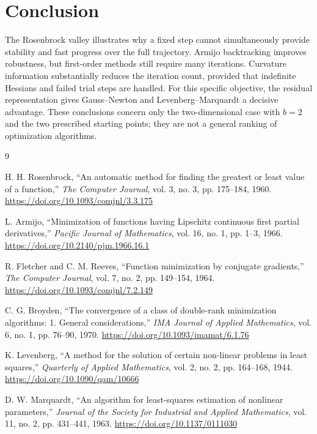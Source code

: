 \documentclass[a4paper,11pt]{article}
\begin{document}
\section{Conclusion}

The Rosenbrock valley illustrates why a fixed step cannot simultaneously
provide stability and fast progress over the full trajectory. Armijo
backtracking improves robustness, but first-order methods still require many
iterations. Curvature information substantially reduces the iteration count,
provided that indefinite Hessians and failed trial steps are handled. For this
specific objective, the residual representation gives Gauss--Newton and
Levenberg--Marquardt a decisive advantage. These conclusions concern only the
two-dimensional case with $b=2$ and the two prescribed starting points; they
are not a general ranking of optimization algorithms.

\begin{thebibliography}{9}

H. H. Rosenbrock,
``An automatic method for finding the greatest or least value of a function,''
\emph{The Computer Journal}, vol. 3, no. 3, pp. 175--184, 1960.
\url{https://doi.org/10.1093/comjnl/3.3.175}

L. Armijo,
``Minimization of functions having Lipschitz continuous first partial derivatives,''
\emph{Pacific Journal of Mathematics}, vol. 16, no. 1, pp. 1--3, 1966.
\url{https://doi.org/10.2140/pjm.1966.16.1}

R. Fletcher and C. M. Reeves,
``Function minimization by conjugate gradients,''
\emph{The Computer Journal}, vol. 7, no. 2, pp. 149--154, 1964.
\url{https://doi.org/10.1093/comjnl/7.2.149}

C. G. Broyden,
``The convergence of a class of double-rank minimization algorithms: 1. General considerations,''
\emph{IMA Journal of Applied Mathematics}, vol. 6, no. 1, pp. 76--90, 1970.
\url{https://doi.org/10.1093/imamat/6.1.76}

K. Levenberg,
``A method for the solution of certain non-linear problems in least squares,''
\emph{Quarterly of Applied Mathematics}, vol. 2, no. 2, pp. 164--168, 1944.
\url{https://doi.org/10.1090/qam/10666}

D. W. Marquardt,
``An algorithm for least-squares estimation of nonlinear parameters,''
\emph{Journal of the Society for Industrial and Applied Mathematics}, vol. 11,
no. 2, pp. 431--441, 1963.
\url{https://doi.org/10.1137/0111030}

\end{thebibliography}
\end{document}
